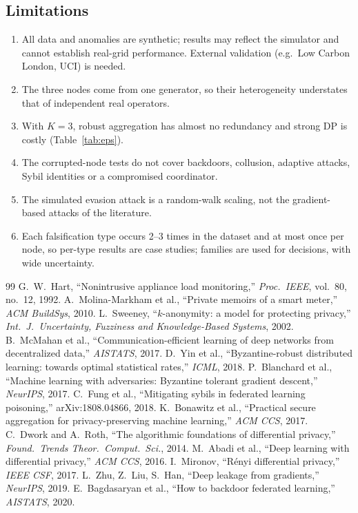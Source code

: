\documentclass[11pt,a4paper]{article}
\begin{document}
\subsection{Limitations}

\begin{enumerate}
  \item All data and anomalies are synthetic; results may reflect the simulator and cannot establish real-grid performance. External validation (e.g.\ Low Carbon London, UCI) is needed.
  \item The three nodes come from one generator, so their heterogeneity understates that of independent real operators.
  \item With $K=3$, robust aggregation has almost no redundancy and strong DP is costly (Table~\ref{tab:eps}).
  \item The corrupted-node tests do not cover backdoors, collusion, adaptive attacks, Sybil identities or a compromised coordinator.
  \item The simulated evasion attack is a random-walk scaling, not the gradient-based attacks of the literature.
  \item Each falsification type occurs 2--3 times in the dataset and at most once per node, so per-type results are case studies; families are used for decisions, with wide uncertainty.
\end{enumerate}

\begin{thebibliography}{99}\small
{} G.~W.~Hart, ``Nonintrusive appliance load monitoring,'' \emph{Proc.\ IEEE}, vol.~80, no.~12, 1992.
 A.~Molina-Markham et al., ``Private memoirs of a smart meter,'' \emph{ACM BuildSys}, 2010.
 L.~Sweeney, ``$k$-anonymity: a model for protecting privacy,'' \emph{Int.\ J.\ Uncertainty, Fuzziness and Knowledge-Based Systems}, 2002.
 B.~McMahan et al., ``Communication-efficient learning of deep networks from decentralized data,'' \emph{AISTATS}, 2017.
 D.~Yin et al., ``Byzantine-robust distributed learning: towards optimal statistical rates,'' \emph{ICML}, 2018.
 P.~Blanchard et al., ``Machine learning with adversaries: Byzantine tolerant gradient descent,'' \emph{NeurIPS}, 2017.
 C.~Fung et al., ``Mitigating sybils in federated learning poisoning,'' arXiv:1808.04866, 2018.
 K.~Bonawitz et al., ``Practical secure aggregation for privacy-preserving machine learning,'' \emph{ACM CCS}, 2017.
 C.~Dwork and A.~Roth, ``The algorithmic foundations of differential privacy,'' \emph{Found.\ Trends Theor.\ Comput.\ Sci.}, 2014.
 M.~Abadi et al., ``Deep learning with differential privacy,'' \emph{ACM CCS}, 2016.
 I.~Mironov, ``R\'enyi differential privacy,'' \emph{IEEE CSF}, 2017.
 L.~Zhu, Z.~Liu, S.~Han, ``Deep leakage from gradients,'' \emph{NeurIPS}, 2019.
 E.~Bagdasaryan et al., ``How to backdoor federated learning,'' \emph{AISTATS}, 2020.
\end{thebibliography}
\end{document}
